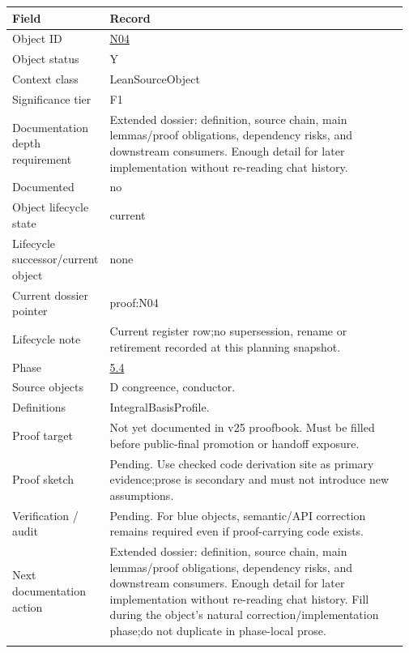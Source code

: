 \begin{longtable}{L{0.16\linewidth} L{0.81\linewidth}}
\hline
\textbf{Field} & \textbf{Record}\\
\hline
Object ID & \hyperlink{object-row-N04}{N04}\\
\hline\addlinespace[0.20em]
Object status & Y\\
\hline\addlinespace[0.20em]
Context class & LeanSourceObject\\
\hline\addlinespace[0.20em]
Significance tier & F1\\
\hline\addlinespace[0.20em]
Documentation depth requirement & Extended dossier: definition, source chain, main lemmas/\allowbreak{}proof obligations, dependency risks, and downstream consumers. Enough detail for later implementation without re-reading chat history.\\
\hline\addlinespace[0.20em]
Documented & no\\
\hline\addlinespace[0.20em]
Object lifecycle state & current\\
\hline\addlinespace[0.20em]
Lifecycle successor/\allowbreak{}current object & none\\
\hline\addlinespace[0.20em]
Current dossier pointer & proof:N04\\
\hline\addlinespace[0.20em]
Lifecycle note & Current register row;\newline no supersession, rename or retirement recorded at this planning snapshot.\\
\hline\addlinespace[0.20em]
Phase & \hyperlink{phase-row-5-4}{5.4}\\
\hline\addlinespace[0.20em]
Source objects & D congreence, conductor.\\
\hline\addlinespace[0.20em]
Definitions & IntegralBasisProfile.\\
\hline\addlinespace[0.20em]
Proof target & Not yet documented in v25 proofbook. Must be filled before public-final promotion or handoff exposure.\\
\hline\addlinespace[0.20em]
Proof sketch & Pending. Use checked code derivation site as primary evidence;\newline prose is secondary and must not introduce new assumptions.\\
\hline\addlinespace[0.20em]
Verification /\allowbreak{} audit & Pending. For blue objects, semantic/\allowbreak{}API correction remains required even if proof-carrying code exists.\\
\hline\addlinespace[0.20em]
Next documentation action & Extended dossier: definition, source chain, main lemmas/\allowbreak{}proof obligations, dependency risks, and downstream consumers. Enough detail for later implementation without re-reading chat history. Fill during the object's natural correction/\allowbreak{}implementation phase;\newline do not duplicate in phase-local prose.\\
\hline\addlinespace[0.20em]
\end{longtable}

